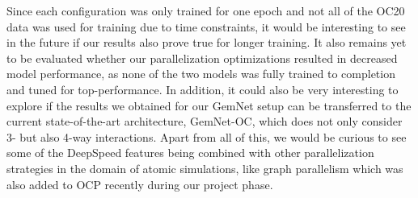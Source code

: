 Since each configuration was only trained for one epoch and not all of the OC20 data was 
used for training due to time constraints, it would be interesting to see in the future if our results 
also prove true for longer training. It also remains yet to be evaluated whether our
parallelization optimizations resulted in decreased model performance, as none of the two 
models was fully trained to completion and tuned for top-performance.
In addition, it could also be very interesting to explore if the results we obtained for our GemNet setup
can be transferred to the current state-of-the-art architecture, GemNet-OC, which does not only
consider 3- but also 4-way interactions.
Apart from all of this, we would be curious to see some of the DeepSpeed features being
combined with other parallelization strategies in the domain of atomic simulations, like 
graph parallelism \cite{https://doi.org/10.48550/arxiv.2203.09697} which was also added to
OCP recently during our project phase.

